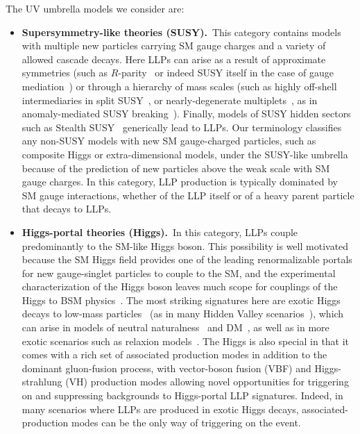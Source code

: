 The UV umbrella models we consider are:
%
\begin{itemize}

\item {\bf Supersymmetry-like theories (SUSY).}~This category contains models with multiple new particles carrying SM gauge charges and a variety of allowed cascade decays.
Here LLPs can arise as a result of approximate symmetries (such as $R$-parity~\cite{Barbier:2004ez,LopezFogliani:2005yw,Ghosh:2017yeh} or indeed SUSY itself in the case of gauge mediation~\cite{Dimopoulos:1996vz}) or through a hierarchy of mass scales (such as highly off-shell intermediaries in split SUSY~\cite{ArkaniHamed:2004fb}, or nearly-degenerate multiplets~\cite{Chen:1995yu,Thomas:1998wy,Byrne:2003sa}, as in anomaly-mediated SUSY breaking~\cite{Feng:1999fu}).  Finally, models of SUSY hidden sectors such as Stealth SUSY~\cite{Fan:2011yu} generically lead to LLPs. 
Our terminology classifies any non-SUSY models with new SM gauge-charged particles, such as composite Higgs or extra-dimensional models, under the SUSY-like umbrella because of the prediction of new particles above the weak scale with SM gauge charges.  In this category, LLP production is typically dominated by SM gauge interactions, whether of the LLP itself or of a heavy parent particle that decays to LLPs.

\item {\bf Higgs-portal theories (Higgs).}~In this category, LLPs couple predominantly to the SM-like Higgs boson.
This possibility is well motivated because the SM Higgs field provides one of the leading renormalizable portals for new gauge-singlet particles to couple to the SM, and the experimental characterization of the Higgs boson leaves much scope for couplings of the Higgs to BSM physics~\cite{Khachatryan:2014jba,Aad:2015pla}.
The most striking signatures here are exotic Higgs decays to low-mass particles~\cite{Curtin:2013fra} (as in many Hidden Valley scenarios~\cite{Strassler:2006im,Strassler:2006ri}), which can arise in models of neutral naturalness~\cite{Chacko:2005pe,Burdman:2006tz,Craig:2015pha} and DM~\cite{Silveira:1985rk}, as well as in more exotic scenarios such as relaxion models~\cite{Beauchesne:2017ukw}.
The Higgs is also special in that it comes with a rich set of associated production modes in addition to the dominant gluon-fusion process, with vector-boson fusion (VBF) and Higgs-strahlung (VH) production modes allowing novel opportunities for triggering on and suppressing backgrounds to Higgs-portal LLP signatures.
Indeed, in many scenarios where LLPs are produced in exotic Higgs decays, associated-production modes can be the only way of triggering on the event.


\end{itemize}
